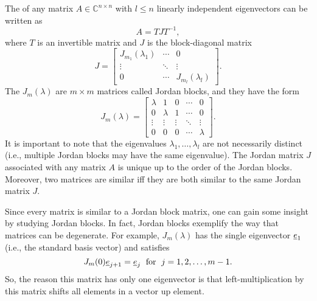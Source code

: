 \begin{definition}
The  of any matrix $A\in \mathbb{C}^{n \times n}$ with $l \leq n$ linearly independent eigenvectors can be written as
\begin{equation*}
A = T J T^{-1} ,
\end{equation*}
where $T$ is an invertible matrix and $J$ is the block-diagonal matrix
\begin{equation*}
J = \left[ \begin{array}{ccc}
J_{m_1}(\lambda_1) & \cdots & 0 \\
\vdots & \ddots & \vdots \\
0 & \cdots & J_{m_l}(\lambda_l)
\end{array} \right] .
\end{equation*}
The $J_m (\lambda)$ are $m\times m$ matrices called Jordan blocks, and they have the form
\begin{equation*}
J_m (\lambda) = \left[ \begin{array}{ccccc}
\lambda & 1 & 0 &\cdots & 0 \\
0 & \lambda & 1 & \cdots & 0 \\
\vdots & \vdots & \vdots & \ddots & \vdots \\
0 & 0 & 0 & \cdots & \lambda
\end{array} \right] .
\end{equation*}
It is important to note that the eigenvalues $\lambda_1, \ldots, \lambda_l$ are not necessarily distinct (i.e., multiple Jordan blocks may have the same eigenvalue).
The Jordan matrix $J$ associated with any matrix $A$ is unique up to the order of the Jordan blocks.
Moreover, two matrices are similar iff they are both similar to the same Jordan matrix $J$.
\end{definition}


Since every matrix is similar to a Jordan block matrix, one can gain some insight by studying Jordan blocks.
In fact, Jordan blocks exemplify the way that matrices can be degenerate.
For example, $J_m (\lambda)$ has the single eigenvector $\underline{e}_1$ (i.e., the standard basis vector) and satisfies
\[ J_m (0) \underline{e}_{j+1} = \underline{e}_j \; \textrm{ for } \; j=1,2,\ldots,m-1. \]
So, the reason this matrix has only one eigenvector is that left-multiplication by this matrix shifts all elements in a vector up element.

